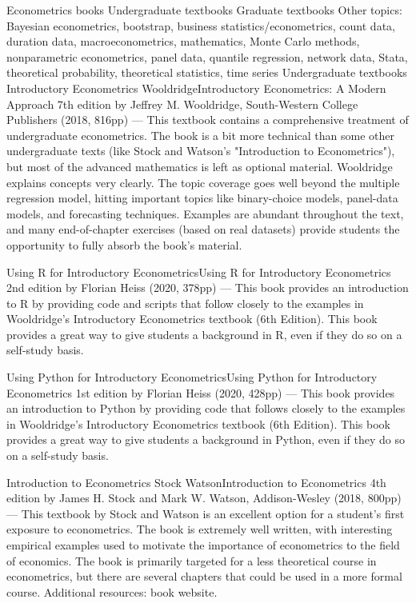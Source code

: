 Econometrics books
Undergraduate textbooks
Graduate textbooks
Other topics:  Bayesian econometrics, bootstrap, business statistics/econometrics, count data, duration data, macroeconometrics, mathematics, Monte Carlo methods, nonparametric econometrics, panel data, quantile regression, network data, Stata, theoretical probability, theoretical statistics, time series
Undergraduate textbooks
Introductory Econometrics WooldridgeIntroductory Econometrics: A Modern Approach 7th edition by Jeffrey M. Wooldridge, South-Western College Publishers (2018, 816pp) --- This textbook contains a comprehensive treatment of undergraduate econometrics.  The book is a bit more technical than some other undergraduate texts (like Stock and Watson's "Introduction to Econometrics"), but most of the advanced mathematics is left as optional material.  Wooldridge explains concepts very clearly.  The topic coverage goes well beyond the multiple regression model, hitting important topics like binary-choice models, panel-data models, and forecasting techniques.  Examples are abundant throughout the text, and many end-of-chapter exercises (based on real datasets) provide students the opportunity to fully absorb the book's material.

Using R for Introductory EconometricsUsing R for Introductory Econometrics 2nd edition by Florian Heiss (2020, 378pp) --- This book provides an introduction to R by providing code and scripts that follow closely to the examples in Wooldridge's Introductory Econometrics textbook (6th Edition).  This book provides a great way to give students a background in R, even if they do so on a self-study basis.

Using Python for Introductory EconometricsUsing Python for Introductory Econometrics 1st edition by Florian Heiss (2020, 428pp) --- This book provides an introduction to Python by providing code that follows closely to the examples in Wooldridge's Introductory Econometrics textbook (6th Edition).  This book provides a great way to give students a background in Python, even if they do so on a self-study basis.

Introduction to Econometrics Stock WatsonIntroduction to Econometrics 4th edition by James H. Stock and Mark W. Watson, Addison-Wesley (2018, 800pp) --- This textbook by Stock and Watson is an excellent option for a student's first exposure to econometrics.  The book is extremely well written, with interesting empirical examples used to motivate the importance of econometrics to the field of economics.  The book is primarily targeted for a less theoretical course in econometrics, but there are several chapters that could be used in a more formal course.  Additional resources:  book website.

